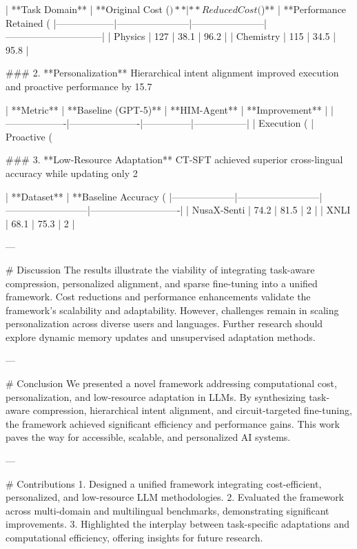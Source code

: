| **Task Domain** | **Original Cost ($)** | **Reduced Cost ($)** | **Performance Retained (%
|------------------|-----------------------|-----------------------|------------------------------|  
| Physics          | 127                  | 38.1                 | 96.2                         |  
| Chemistry        | 115                  | 34.5                 | 95.8                         |  

### 2. **Personalization**  
Hierarchical intent alignment improved execution and proactive performance by 15.7%

| **Metric**       | **Baseline (GPT-5)** | **HIM-Agent** | **Improvement** |  
|-------------------|----------------------|---------------|-----------------|  
| Execution (%
| Proactive (%

### 3. **Low-Resource Adaptation**  
CT-SFT achieved superior cross-lingual accuracy while updating only 2%

| **Dataset**       | **Baseline Accuracy (%
|--------------------|--------------------------|--------------------------|----------------------------|  
| NusaX-Senti        | 74.2                    | 81.5                    | 2                          |  
| XNLI               | 68.1                    | 75.3                    | 2                          |  

---

# Discussion  
The results illustrate the viability of integrating task-aware compression, personalized alignment, and sparse fine-tuning into a unified framework. Cost reductions and performance enhancements validate the framework’s scalability and adaptability. However, challenges remain in scaling personalization across diverse users and languages. Further research should explore dynamic memory updates and unsupervised adaptation methods.

---

# Conclusion  
We presented a novel framework addressing computational cost, personalization, and low-resource adaptation in LLMs. By synthesizing task-aware compression, hierarchical intent alignment, and circuit-targeted fine-tuning, the framework achieved significant efficiency and performance gains. This work paves the way for accessible, scalable, and personalized AI systems.

---

# Contributions  
1. Designed a unified framework integrating cost-efficient, personalized, and low-resource LLM methodologies.  
2. Evaluated the framework across multi-domain and multilingual benchmarks, demonstrating significant improvements.  
3. Highlighted the interplay between task-specific adaptations and computational efficiency, offering insights for future research.  